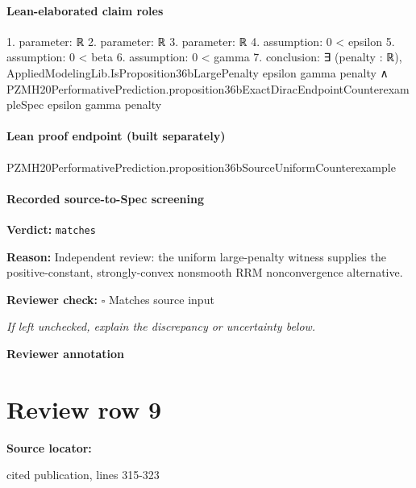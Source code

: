 \documentclass[10pt]{article}
\newcommand{\reviewerbox}{%
  \par\noindent\fbox{\parbox{0.96\linewidth}{\rule{0pt}{0.38in}}}\par
}
\newcommand{\reviewmatch}[1]{%
  \par\noindent\textbf{Reviewer check:} $\square$\; #1\par
  \noindent\emph{If left unchecked, explain the discrepancy or uncertainty below.}\par
}
\begin{document}
\paragraph{Lean-elaborated claim roles}\begin{ReviewVerbatim}
1. parameter: ℝ
2. parameter: ℝ
3. parameter: ℝ
4. assumption: 0 < epsilon
5. assumption: 0 < beta
6. assumption: 0 < gamma
7. conclusion: ∃ (penalty : ℝ),
  AppliedModelingLib.IsProposition36bLargePenalty epsilon gamma penalty ∧
    PZMH20PerformativePrediction.proposition36bExactDiracEndpointCounterexampleSpec epsilon gamma penalty
\end{ReviewVerbatim}

\paragraph{Lean proof endpoint (built separately)}\begin{ReviewVerbatim}
PZMH20PerformativePrediction.proposition36bSourceUniformCounterexample
\end{ReviewVerbatim}

\paragraph{Recorded source-to-Spec screening}
\textbf{Verdict:} \texttt{matches}
\\
{\raggedright
\textbf{Reason:} Independent review:\allowbreak{} the uniform large-\allowbreak{}penalty witness supplies the positive-\allowbreak{}constant, strongly-\allowbreak{}convex nonsmooth RRM nonconvergence alternative.\allowbreak{}
\par}
\reviewmatch{Matches source input}
\noindent\textbf{Reviewer annotation}\par
\reviewerbox
\clearpage
\hypertarget{source-claim-e1c86b604c5fef5c}{}
\section*{Review row 9}
\textbf{Source locator:} {\footnotesize\raggedright cited publication, lines 315-\allowbreak{}323\par}
\end{document}
